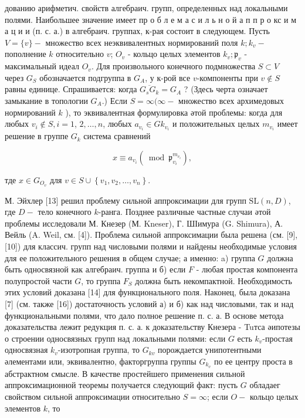 \documentclass[10pt]{article}
\begin{document}
дованию арифметич. свойств алгебраич. групп, определенных над локальными полями. Наибольшее значение имеет пр о б л е м а с и л ь н о й а п п р о кс и м а ц и и (п. с. а.) в алгебраич. группах, к-рая состоит в следующем. Пусть $V=\{v\}-$ множество всех неэквивалентных нормирований поля $k ; k_{v}-$ пополнение $k$ относительно $v$; $O_{v}$ - кольцо целых элементов $k_{v} ; \mathfrak{p}_{v}$ - максимальный идеал $O_{v}$. Для произвольного конечного подмножества $S \subset V$ через $G_{S}$ обозначается подгруппа в $G_{A}$, у к-рой все $v$-компоненты при $v \notin S$ равны единице. Спрашивается: когда $\overline{G_{s} G_{k}}=G_{A}$ ? (Здесь черта означает замыкание в топологии $G_{A}$.) Если $S=\infty(\infty-$ множество всех архимедовых нормирований $k$ ), то эквивалентная формулировка әтой проблемы: когда для любых $v_{i} \notin S, i=1$, $2, \ldots, n$, любых $a_{v_{i}} \in G k_{v_{i}}$ и положительных целых $m_{v_{i}}$ имеет решение в группе $G_{k}$ система сравнений



\[

x \equiv a_{v_{i}}\left(\bmod \mathfrak{p}_{v_{i}}^{m_{v_{i}}}\right),

\]



тде $x \in G_{O_{v}}$ для $v \in S \cup\left\{v_{1}, v_{2}, \ldots, v_{n}\right\}$.



М. Эйхлер [13] решил проблему сильной аппроксимации для групп $\mathrm{SL}(n, D)$, где $D-$ тело конечного $k$-ранга. Позднее различные частные случаи әтой проблемы исследовали М. Кнезер (М. Kneser), Г. ШІимура (G. Shimura), А. Вейль (A. Weil, см. [4]). Проблема сильной аппроксимации была решена (см. [9], [10]) для классич. групп над числовыми полями и найдены необходимые условия для ее положительного решения в общем случае; а именно: a) группа $G$ должна быть односвязной как алгебраич. группа и б) если $F$ - любая простая компонента полупростой части $G$, то группа $F_{S}$ должна быть некомпактной. Необходимость этих условий доказана [14] для функционального поля. Наконец, была доказана [7] (см. также [16]) достаточность условий а) и б) как над числовыми, так и над функциональными полями, что дало полное решение п. с. а. В основе метода доказательства лежит редукция п. с. а. к доказательству Кнезера - Tuтса әипотезы о строении односвязных групп над локальными полями: если $G$ есть $k_{v}$-простая односвязная $k_{v}$-изотропная группа, то $G_{k v}$ порождается унипотентными әлементами или, эквивалентно, факторгруппа группы $G_{k_{v}}$ по ее центру проста в абстрактном смысле. В качестве простейшего применения сильной аппроксимационной теоремы получается следующий факт: пусть $G$ обладаег свойством сильной аппроксимации относительно $S=\infty$; если $O-$ кольцо целых элементов $k$, то
\end{document}
